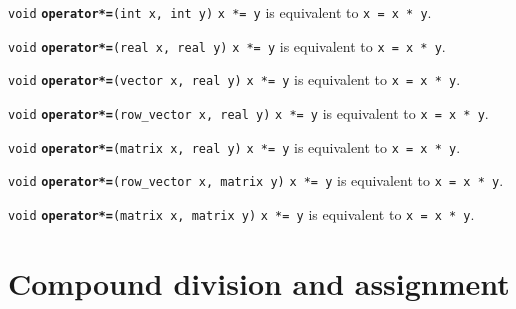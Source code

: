 \documentclass[
  10pt,
]{book}
\begin{document}

\texttt{void} \textbf{\texttt{operator*=}}\texttt{(int\ x,\ int\ y)}\newline
\texttt{x\ *=\ y} is equivalent to \texttt{x\ =\ x\ *\ y}.


\texttt{void} \textbf{\texttt{operator*=}}\texttt{(real\ x,\ real\ y)}\newline
\texttt{x\ *=\ y} is equivalent to \texttt{x\ =\ x\ *\ y}.


\texttt{void} \textbf{\texttt{operator*=}}\texttt{(vector\ x,\ real\ y)}\newline
\texttt{x\ *=\ y} is equivalent to \texttt{x\ =\ x\ *\ y}.


\texttt{void} \textbf{\texttt{operator*=}}\texttt{(row\_vector\ x,\ real\ y)}\newline
\texttt{x\ *=\ y} is equivalent to \texttt{x\ =\ x\ *\ y}.


\texttt{void} \textbf{\texttt{operator*=}}\texttt{(matrix\ x,\ real\ y)}\newline
\texttt{x\ *=\ y} is equivalent to \texttt{x\ =\ x\ *\ y}.


\texttt{void} \textbf{\texttt{operator*=}}\texttt{(row\_vector\ x,\ matrix\ y)}\newline
\texttt{x\ *=\ y} is equivalent to \texttt{x\ =\ x\ *\ y}.


\texttt{void} \textbf{\texttt{operator*=}}\texttt{(matrix\ x,\ matrix\ y)}\newline
\texttt{x\ *=\ y} is equivalent to \texttt{x\ =\ x\ *\ y}.

\hypertarget{compound-division-and-assignment}{%
\section{Compound division and assignment}\label{compound-division-and-assignment}}
\end{document}
